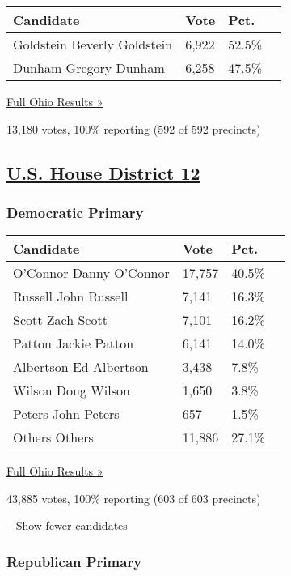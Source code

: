 \begin{longtable}[]{@{}llll@{}}
\toprule
Candidate & Vote & Pct. &\tabularnewline
\midrule
\endhead
 Goldstein Beverly Goldstein & 6,922 & 52.5\% &\tabularnewline
 Dunham Gregory Dunham & 6,258 & 47.5\% &\tabularnewline
\bottomrule
\end{longtable}

\href{https://www.nytimes3xbfgragh.onion/elections/results/ohio}{Full
Ohio Results »}

13,180 votes, 100\% reporting (592 of 592 precincts)

\hypertarget{us-house-district-12}{%
\subsection{\texorpdfstring{\href{https://www.nytimes3xbfgragh.onion/elections/results/ohio-house-district-12-primary-election}{U.S.
House District
12}}{U.S. House District 12}}\label{us-house-district-12}}

\hypertarget{democratic-primary-13}{%
\subsubsection{Democratic Primary}\label{democratic-primary-13}}

\begin{longtable}[]{@{}llll@{}}
\toprule
Candidate & Vote & Pct. &\tabularnewline
\midrule
\endhead
 O'Connor Danny O'Connor & 17,757 & 40.5\% &\tabularnewline
 Russell John Russell & 7,141 & 16.3\% &\tabularnewline
 Scott Zach Scott & 7,101 & 16.2\% &\tabularnewline
 Patton Jackie Patton & 6,141 & 14.0\% &\tabularnewline
 Albertson Ed Albertson & 3,438 & 7.8\% &\tabularnewline
 Wilson Doug Wilson & 1,650 & 3.8\% &\tabularnewline
 Peters John Peters & 657 & 1.5\% &\tabularnewline
 Others Others & 11,886 & 27.1\% &\tabularnewline
\bottomrule
\end{longtable}

\href{https://www.nytimes3xbfgragh.onion/elections/results/ohio}{Full
Ohio Results »}

43,885 votes, 100\% reporting (603 of 603 precincts)

\protect\hyperlink{}{-- Show fewer candidates}

\hypertarget{republican-primary-13}{%
\subsubsection{Republican Primary}\label{republican-primary-13}}

